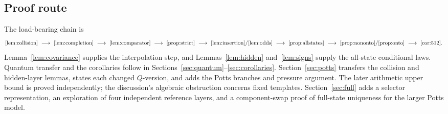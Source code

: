 \subsection{Proof route}
The load-bearing chain is
\[
 \ref{lem:collision}\ \longrightarrow\
 \ref{lem:completion}\ \longrightarrow\
 \ref{lem:comparator}\ \longrightarrow\
 \ref{prop:strict}\ \longrightarrow\
 \ref{lem:insertion}/\ref{lem:odds}\ \longrightarrow\
 \ref{prop:allstates}\ \longrightarrow\
 \ref{prop:nononto}/\ref{prop:onto}\ \longrightarrow\
 \ref{cor:512}.
\]
Lemma~\ref{lem:covariance} supplies the interpolation step, and Lemmas~\ref{lem:hidden} and~\ref{lem:signs} supply the all-state conditional laws. Quantum transfer and the corollaries follow in Sections~\ref{sec:quantum}--\ref{sec:corollaries}. Section~\ref{sec:potts} transfers the collision and hidden-layer lemmas, states each changed $Q$-version, and adds the Potts branches and pressure argument. The later arithmetic upper bound is proved independently; the discussion's algebraic obstruction concerns fixed templates. Section~\ref{sec:full} adds a selector representation, an exploration of four independent reference layers, and a component-swap proof of full-state uniqueness for the larger Potts model.

